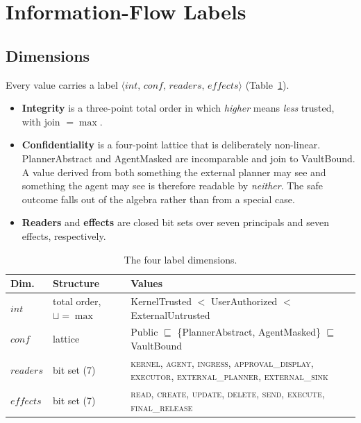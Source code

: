 \documentclass[letterpaper,twocolumn,10pt]{article}
\newcommand{\lbl}[4]{\ensuremath{\langle #1,\,#2,\,#3,\,#4\rangle}}
\newcommand{\READ}{\textsc{read}}
\newcommand{\SEND}{\textsc{send}}
\newcommand{\integ}{\mathit{int}}
\newcommand{\conf}{\mathit{conf}}
\newcommand{\readers}{\mathit{readers}}
\newcommand{\effects}{\mathit{effects}}
\newcommand{\join}{\sqcup}
\begin{document}
\section{Information-Flow Labels}
\label{sec:labels}

\subsection{Dimensions}

Every value carries a label \lbl{\integ}{\conf}{\readers}{\effects}
(Table~\ref{tab:labels}).
\begin{itemize}
\item \textbf{Integrity} is a three-point total order in which
  \emph{higher} means \emph{less} trusted, with join $=\max$.
\item \textbf{Confidentiality} is a four-point lattice that is deliberately
  non-linear. \textsf{PlannerAbstract} and \textsf{AgentMasked} are
  incomparable and join to \textsf{VaultBound}. A value derived from both
  something the external planner may see and something the agent may see
  is therefore readable by \emph{neither}. The safe outcome falls out of
  the algebra rather than from a special case.
\item \textbf{Readers} and \textbf{effects} are closed bit sets over seven
  principals and seven effects, respectively.
\end{itemize}

\begin{table}[!h]
\centering\footnotesize
\begin{tabularx}{\columnwidth}{@{}llX@{}}
\toprule
\textbf{Dim.} & \textbf{Structure} & \textbf{Values}\\
\midrule
$\integ$ & total order, $\join=\max$ &
  \textsf{KernelTrusted} $<$ \textsf{UserAuthorized} $<$ \textsf{ExternalUntrusted}\\
$\conf$ & lattice &
  \textsf{Public} $\sqsubseteq$ \{\textsf{PlannerAbstract}, \textsf{AgentMasked}\} $\sqsubseteq$ \textsf{VaultBound}\\
$\readers$ & bit set (7) &
  \textsc{kernel}, \textsc{agent}, \textsc{ingress}, \textsc{approval\_display}, \textsc{executor}, \textsc{external\_planner}, \textsc{external\_sink}\\
$\effects$ & bit set (7) &
  \READ, \textsc{create}, \textsc{update}, \textsc{delete}, \SEND, \textsc{execute}, \textsc{final\_release}\\
\bottomrule
\end{tabularx}
\caption{The four label dimensions.}
\label{tab:labels}
\end{table}
\end{document}
